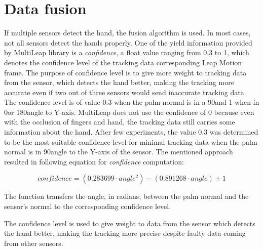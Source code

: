 \section{Data fusion}

If multiple sensors detect the hand, the fusion algorithm is used. In most cases, not all sensors detect the hands properly. One of the yield information provided by MultiLeap library is a \textit{confidence}, a float value ranging from 0.3 to 1, which denotes the confidence level of the tracking data corresponding Leap Motion frame. The purpose of confidence level is to give more weight to tracking data from the sensor, which detects the hand better, making the tracking more accurate even if two out of three sensors would send inaccurate tracking data. The confidence level is of value 0.3 when the palm normal is in a 90\textdegree and 1 when in 0\textdegree or 180\textdegree angle to Y-axis. MultiLeap does not use the confidence of 0 because even with the occlusion of fingers and hand, the tracking data still carries some information about the hand. After few experiments, the value 0.3 was determined to be the most suitable confidence level for minimal tracking data when the palm normal is in 90\textdegree angle to the Y-axis of the sensor. The mentioned approach resulted in following equation for \textit{confidence} computation:

\begin{equation}
    {confidence = (0.283699 \cdot angle^2)-(0.891268 \cdot angle)+1}
\end{equation}

The function transfers the angle, in radians, between the palm normal and the sensor's normal to the corresponding confidence level. \cite{tomasMultileap}

The confidence level is used to give weight to data from the sensor which detects the hand better, making the tracking more precise despite faulty data coming from other sensors.